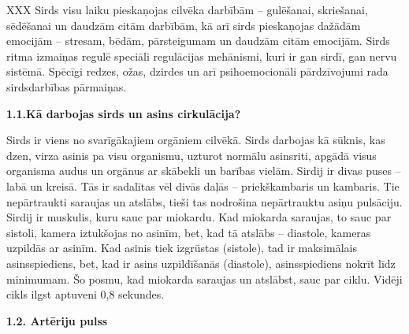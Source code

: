 \documentclass[12pt]{article}
\begin{document}
XXX
Sirds visu laiku pieskaņojas cilvēka darbībām – gulēšanai, skriešanai, sēdēšanai un daudzām citām darbībām, kā arī sirds pieskaņojas dažādām emocijām – stresam, bēdām, pārsteigumam un daudzām citām emocijām. Sirds ritma izmaiņas regulē speciāli regulācijas mehānismi, kuri ir gan sirdī, gan nervu sistēmā. Spēcīgi redzes, ožas, dzirdes un arī psihoemocionāli pārdzīvojumi rada sirdsdarbības pārmaiņas. 

\begin{center}
{\bf 1.1.Kā darbojas sirds un asins cirkulācija?}
\end{center}
	 

Sirds ir viens no svarīgākajiem orgāniem cilvēkā. Sirds darbojas kā sūknis, kas dzen, virza asinis pa visu organismu, uzturot normālu asinsriti, apgādā visus organisma audus un orgānus ar skābekli un barības vielām. Sirdij ir divas puses – labā un kreisā. Tās ir sadalītas vēl divās daļās – priekškambaris un kambaris. Tie nepārtraukti saraujas un atslābs, tieši tas nodrošina nepārtrauktu asiņu pulsāciju. Sirdij ir muskulis, kuru sauc par miokardu. Kad miokarda saraujas, to sauc par sistoli, kamera iztukšojas no asinīm, bet, kad tā atslābs – diastole, kameras uzpildās ar asinīm. Kad asinis tiek izgrūstas (sistole), tad ir maksimālais asinsspiediens, bet, kad ir asins uzpildīšanās (diastole), asinsspiediens nokrīt līdz minimumam. Šo posmu, kad miokarda saraujas un atslābst, sauc par ciklu. Vidēji cikls ilgst aptuveni 0,8 sekundes. 

\begin{center}
{\bf 1.2. Artēriju pulss}
\end{center}
\end{document}
